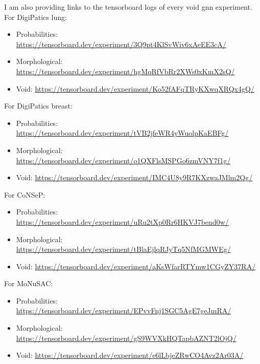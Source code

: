 I am also providing links to the tensorboard logs of every void gnn experiment. For DigiPatics lung:

\begin{itemize}
    \item Probabilities: \url{https://tensorboard.dev/experiment/3Q9pt4KlSvWiv6xAeEE3cA/}
    \item Morphological: \url{https://tensorboard.dev/experiment/hgMqRfVbRr2XWs0xKmX2sQ/}
    \item Void: \url{https://tensorboard.dev/experiment/Ko52fAFqTRyKXwqXRQx4gQ/}
\end{itemize}

\noindent For DigiPatics breast:

\begin{itemize}
    \item Probabilities: \url{https://tensorboard.dev/experiment/tVB2jfeWR4yWuolpKaEBFg/}
    \item Morphological: \url{https://tensorboard.dev/experiment/o1QXFlsMSPGo6zmVNY7f1g/}
    \item Void: \url{https://tensorboard.dev/experiment/IMC4U8y9R7KXzwaJMlm2Qg/}
\end{itemize}

\noindent For CoNSeP:

\begin{itemize}
    \item Probabilities: \url{https://tensorboard.dev/experiment/uRu2tXp0Rr6HKVJ7bend0w/}
    \item Morphological: \url{https://tensorboard.dev/experiment/tBlaEjlqRJyTq5NfMGMWEg/}
    \item Void: \url{https://tensorboard.dev/experiment/aKsWfarRTYmw1CGyZY37RA/}
\end{itemize}

\noindent For MoNuSAC:

\begin{itemize}
    \item Probabilities: \url{https://tensorboard.dev/experiment/EPvvFnj1SGC5AgE7geJmRA/}
    \item Morphological: \url{https://tensorboard.dev/experiment/gS9WVXkHQTapbAZNT2lOjQ/}
    \item Void: \url{https://tensorboard.dev/experiment/e6lLbjeZRwCO4Avz2Ar03A/}
\end{itemize}

